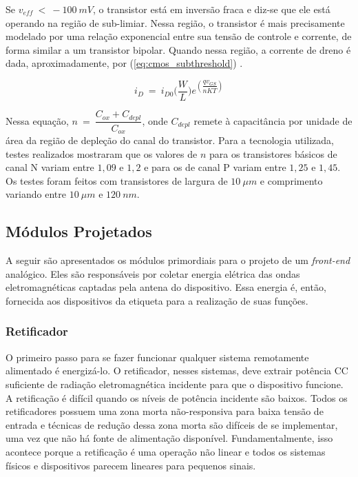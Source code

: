 \begin{citacao}
	Se $v_{eff}~<~-100~mV$, o transistor está em inversão fraca e diz-se que ele está operando na região de sub-limiar. Nessa região, o transistor é mais precisamente modelado por uma relação exponencial entre sua tensão de controle e corrente, de forma similar a um transistor bipolar. Quando nessa região, a corrente de dreno é dada, aproximadamente, por (\ref{eq:cmos_subthreshold}) \cite{MARTIN:1997}.
\end{citacao}

\begin{equation}
	\label{eq:cmos_subthreshold}
	i_D~=~i_{D0} \Big ( \dfrac{W}{L} \Big ) e^{(\dfrac{q v_{GS}}{nKT})}
\end{equation}

Nessa equação, $n~=~\dfrac{C_{ox}+C_{depl}}{C_{ox}}$, onde $C_{depl}$ remete à capacitância por unidade de área da região de depleção do canal do transistor. Para a tecnologia utilizada, testes realizados mostraram que os valores de $n$ para os transistores básicos de canal N variam entre $1,09$ e $1,2$ e para os de canal P variam entre $1,25$ e $1,45$. Os testes foram feitos com transistores de largura de $10~\mu m$ e comprimento variando entre $10~\mu m$ e $120~nm$.

\subsection{Módulos Projetados}
A seguir são apresentados os módulos primordiais para o projeto de um \textit{front-end} analógico. Eles são responsáveis por coletar energia elétrica das ondas eletromagnéticas captadas pela antena do dispositivo. Essa energia é, então, fornecida aos dispositivos da etiqueta para a realização de suas funções.

\subsubsection{Retificador}
\begin{citacao}
	O primeiro passo para se fazer funcionar qualquer sistema remotamente alimentado é energizá-lo. O retificador, nesses sistemas, deve extrair potência {CC} suficiente de radiação eletromagnética incidente para que o dispositivo funcione. A retificação é difícil quando os níveis de potência incidente são baixos. Todos os retificadores possuem uma zona morta não-responsiva para baixa tensão de entrada e técnicas de redução dessa zona morta são difíceis de se implementar, uma vez que não há fonte de alimentação disponível. Fundamentalmente, isso acontece porque a retificação é uma operação não linear e todos os sistemas físicos e dispositivos parecem lineares para pequenos sinais.
\end{citacao}

